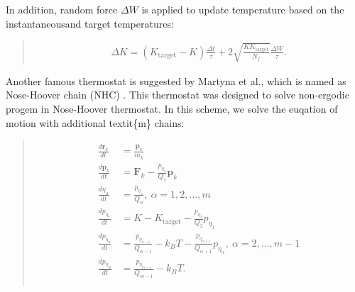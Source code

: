 \documentclass[a4paper,11pt,oneside,english]{sphinxmanual}
\begin{document}
In addition, random force \({\Delta W}\) is applied to update temperature based on the instantaneousand target temperatures:
\begin{quote}

\vspace{-5mm}
\begin{equation*}
\begin{split}\Delta K = \left ( K_{\textrm{target}} - K \right ) \frac{\Delta t}{\tau} + 2 \sqrt{\frac{K K_{\textrm{target}}}{N_{f}}} \frac{\Delta W}{\tau} .\end{split}
\end{equation*}
\vspace{-3mm}
\end{quote}

Another famous thermostat is suggested by Martyna et al., which is named as Nose-Hoover chain (NHC) .
This thermostat was designed to solve non-ergodic progem in Nose-Hoover thermostat.
In this scheme, we solve the euqation of motion with additional textit\{m\} chains:
\begin{quote}

\vspace{-5mm}
\begin{align*}\!\begin{aligned}
\frac{d\mathbf{r}_{k}}{dt} & = \frac{\mathbf{p}_{k}}{m_{k}}\\
\frac{d\mathbf{p}_{k}}{dt} & = \mathbf{F}_{k} - \frac{p_{\eta_{1}}}{Q_{1}} \mathbf{p}_{k}\\
\frac{d \eta_{\alpha}}{dt} & = \frac{p_{\eta_{\alpha}}}{Q_{\alpha}}, \  \alpha=1,2,...,m\\
\frac{d p_{\eta_{1}}}{dt} & = K - K_{\textrm{target}} - \frac{p_{\eta_{2}}}{Q_{2}} p_{\eta_{1}}\\
\frac{d p_{\eta_{\alpha}}}{dt} & = \frac{p_{\eta_{\alpha-1}}}{Q_{\alpha-1}} - k_{B}T - \frac{p_{\eta_{\alpha + 1}}}{Q_{\alpha + 1}} p_{\eta_{\alpha}}, \ \alpha = 2,...,m-1\\
\frac{d p_{\eta_{m}}}{dt} & = \frac{p_{\eta_{m-1}}}{Q_{m-1}} - k_{B}T .\\
\end{aligned}\end{align*}
\vspace{-3mm}
\end{quote}
\end{document}
